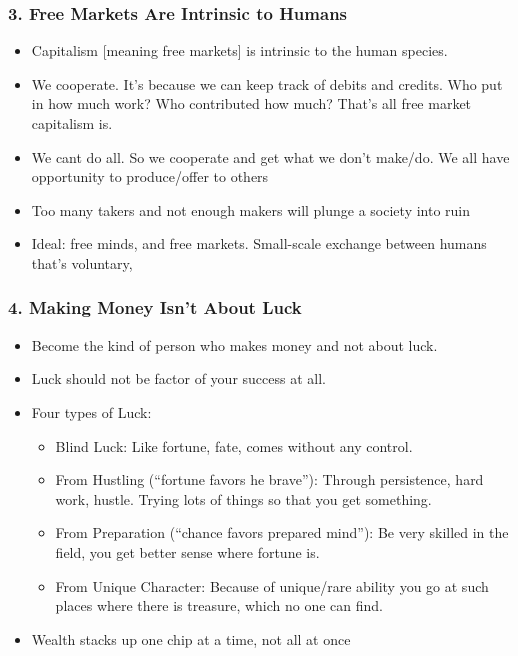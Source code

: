 \begin{frame}[fragile]
\frametitle{3. Free Markets Are Intrinsic to Humans}
\begin{itemize}
\item Capitalism [meaning free markets] is intrinsic to the human species. 
\item We cooperate. It's because we can keep track of debits and credits. Who put in how much work? Who contributed how much? That's all free market capitalism is.
\item We cant do all. So we cooperate and get what we don't make/do. We all have opportunity to produce/offer to others
\item Too many takers and not enough makers will plunge a society into ruin
\item Ideal: free minds, and free markets. Small-scale exchange between humans that's voluntary,
\end{itemize}
\end{frame}

\begin{frame}[fragile]
\frametitle{4. Making Money Isn't About Luck}
\begin{itemize}
\item Become the kind of person who makes money and not about luck.
\item Luck should not be factor of your success at all.
\item Four types of Luck:
\begin{itemize}
\item Blind Luck: Like fortune, fate, comes without any control.
\item From Hustling (``fortune favors he brave''): Through persistence, hard work, hustle. Trying lots of things so that you get something.
\item From Preparation (``chance favors prepared mind''): Be very skilled in the field, you get better sense where fortune is.
\item From Unique Character: Because of unique/rare ability you go at such places where there is treasure, which no one can find.
\end{itemize}
\item Wealth stacks up one chip at a time, not all at once

\end{itemize}
\end{frame}

